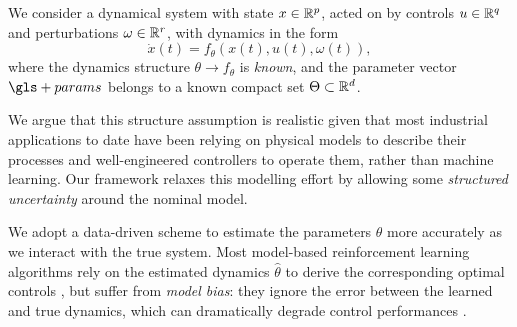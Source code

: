 \begin{assumption}
\begin{leftbar}[assumptionbar]
We consider a dynamical system with state $x\in\mathbb{R}^p$, acted on by controls $u\in\mathbb{R}^q$ and perturbations $\omega\in\mathbb{R}^r$, with dynamics in the form
\begin{equation*}
\dot{x}(t) = f_\theta\left(x(t),u(t),\omega(t)\right),
\end{equation*}
where the dynamics structure $\theta\rightarrow f_\theta$ is \emph{known}, and the parameter vector $\gls+{params}$ belongs to a known compact set $\Theta \subset \mathbb{R}^d$.
\end{leftbar}
\end{assumption}
\noindent We argue that this structure assumption is realistic given that most industrial applications to date have been relying on physical models to describe their processes and well-engineered controllers to operate them, rather than machine learning. Our framework relaxes this modelling effort by allowing some \emph{structured uncertainty} around the nominal model.

We adopt a data-driven scheme to estimate the parameters $\theta$ more accurately as we interact with the true system. Most model-based reinforcement learning algorithms rely on the estimated dynamics $\hat{\theta}$ to derive the corresponding optimal controls \citep[\eg][]{Lenz2015,Levine2016}, but suffer from \emph{model bias}: they ignore the error between the learned and true dynamics, which can dramatically degrade control performances \citep{Doyle1978,Schneider1997}. 


